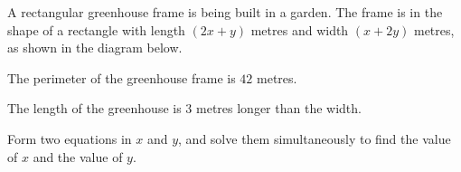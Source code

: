 \begin{question}
\noindent A rectangular greenhouse frame is being built in a garden. The frame is in the shape of a rectangle with length $(2x + y)$ metres and width $(x + 2y)$ metres, as shown in the diagram below.

\begin{center}
\end{center}

\noindent The perimeter of the greenhouse frame is $42$ metres.

\noindent The length of the greenhouse is $3$ metres longer than the width.

\vspace{0.3cm}
\noindent Form two equations in $x$ and $y$, and solve them simultaneously to find the value of $x$ and the value of $y$.

\vspace{5cm}

\begin{flushright}
\end{flushright}
\end{question}
